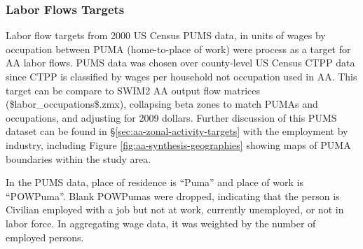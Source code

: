 

\subsubsection{Labor Flows Targets}
Labor flow targets from 2000 US Census PUMS data, in units of wages by occupation between PUMA (home-to-place of work) were process as a target for AA labor flows. PUMS data was chosen over county-level US Census CTPP data since CTPP is classified by wages per household not occupation used in AA. This target can be compare to SWIM2 AA output flow matrices (\$labor\_occupations\$.zmx), collapsing beta zones to match PUMAs and occupations, and adjusting for 2009 dollars. Further discussion of this PUMS dataset can be found in \S\ref{sec:aa-zonal-activity-targets} with the employment by industry, including Figure \ref{fig:aa-synthesis-geographies} showing maps of PUMA boundaries within the study area.

In the PUMS data, place of residence is ``Puma'' and place of work is ``POWPuma''. Blank POWPumas were dropped, indicating that the person is Civilian employed with a job but not at work, currently unemployed, or not in labor force. In aggregating wage data, it was weighted by the number of employed persons. 

